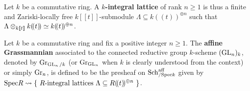             \begin{definition} \label{def: integral_lattices}
                Let $k$ be a commutative ring. A \textbf{$k$-integral lattice} of rank $n \geq 1$ is thus a finite and Zariski-locally free $k[\![t]\!]$-submodule $\Lambda \subseteq k(\!(t)\!)^{\oplus n}$ such that $\Lambda \tensor_{k[\![t]\!]} k(\!(t)\!) \cong k(\!(t)\!)^{\oplus n}$. 
            \end{definition}
            \begin{definition} \label{def: the_affine_grassmannian_for_GLn}
                Let $k$ be a commutative ring and fix a positive integer $n \geq 1$. The \textbf{affine Grassmannian} associated to the connected reductive group $k$-scheme $(\operatorname{GL}_n)_k$, denoted by $\mathrm{Gr}_{\operatorname{GL}_n/k}$ (or $\mathrm{Gr}_{\operatorname{GL}_n}$ when $k$ is clearly understood from the context) or simply $\mathrm{Gr}_n$, is defined to be the presheaf on $\mathrm{Sch}_{/\mathrm{Spec} k}^{\mathrm{aff}}$ given by $\mathrm{Spec} R \leadsto \left\{ \text{ $R$-integral lattices $\Lambda \subseteq R(\!(t)\!)^{\oplus n}$ } \right\}$.
            \end{definition}
            
